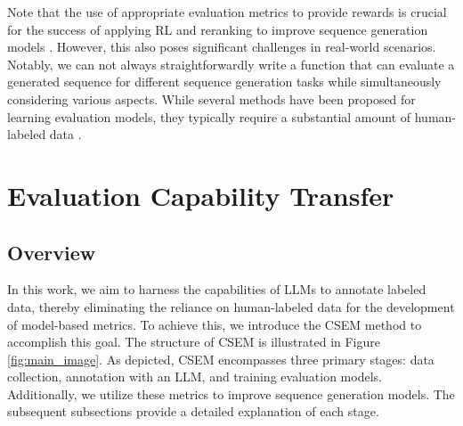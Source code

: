 \documentclass[lettersize,journal]{IEEEtran}
\begin{document}
Note that the use of appropriate evaluation metrics to provide rewards is crucial for the success of applying RL and reranking to improve sequence generation models \cite{shu2021reward, fernandes2022quality}. However, this also poses significant challenges in real-world scenarios. Notably, we can not always straightforwardly write a function that can evaluate a generated sequence for different sequence generation tasks while simultaneously considering various aspects. While several methods have been proposed for learning evaluation models, they typically require a substantial amount of human-labeled data \cite{zhang2016learning, rei2020comet, fernandes2022quality}.

\section{Evaluation Capability Transfer}
\subsection{Overview}
In this work, we aim to harness the capabilities of LLMs to annotate labeled data, thereby eliminating the reliance on human-labeled data for the development of model-based metrics. To achieve this, we introduce the CSEM method to accomplish this goal. The structure of CSEM is illustrated in Figure \ref{fig:main_image}. As depicted, CSEM encompasses three primary stages: data collection, annotation with an LLM, and training evaluation models. Additionally, we utilize these metrics to improve sequence generation models. The subsequent subsections provide a detailed explanation of each stage.
\end{document}
